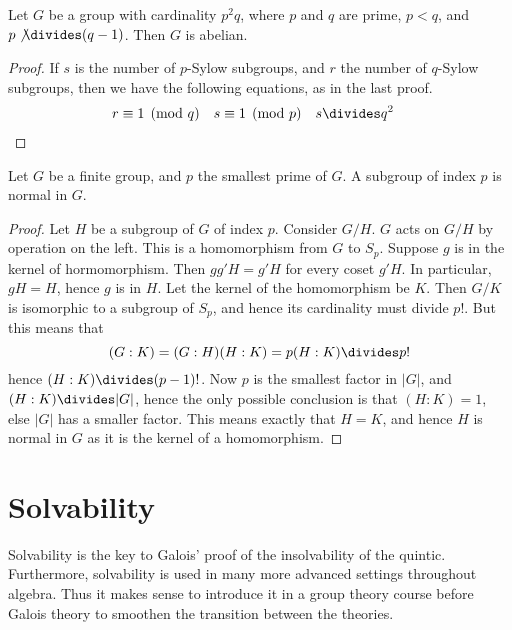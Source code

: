 \begin{theorem}
    Let $G$ be a group with cardinality $p^2q$, where $p$ and $q$ are prime, $p < q$, and $p \not \divides (q-1)$. Then $G$ is abelian.
\end{theorem}
\begin{proof}
    If $s$ is the number of $p$-Sylow subgroups, and $r$ the number of $q$-Sylow subgroups, then we have the following equations, as in the last proof.
    \begin{align*} r &\equiv 1 \pmod{q} & s &\equiv 1 \pmod{p} & s &\divides q^2 \end{align*}
\end{proof}

\begin{theorem}
    Let $G$ be a finite group, and $p$ the smallest prime of $G$. A subgroup of index $p$ is normal in $G$.
\end{theorem}
\begin{proof}
    Let $H$ be a subgroup of $G$ of index $p$. Consider $G/H$. $G$ acts on $G/H$ by operation on the left. This is a homomorphism from $G$ to $S_p$. Suppose $g$ is in the kernel of hormomorphism. Then $gg'H = g'H$ for every coset $g'H$. In particular, $gH = H$, hence $g$ is in $H$. Let the kernel of the homomorphism be $K$. Then $G/K$ is isomorphic to a subgroup of $S_p$, and hence its cardinality must divide $p!$. But this means that
    \[ (G:K) = (G:H)(H:K) = p(H:K) \divides p! \]
    hence $(H:K) \divides (p-1)!$. Now $p$ is the smallest factor in $|G|$, and $(H:K) \divides |G|$, hence the only possible conclusion is that $(H:K) = 1$, else $|G|$ has a smaller factor. This means exactly that $H = K$, and hence $H$ is normal in $G$ as it is the kernel of a homomorphism.
\end{proof}









\chapter{Solvability}

Solvability is the key to Galois' proof of the insolvability of the quintic. Furthermore, solvability is used in many more advanced settings throughout algebra. Thus it makes sense to introduce it in a group theory course before Galois theory to smoothen the transition between the theories.

